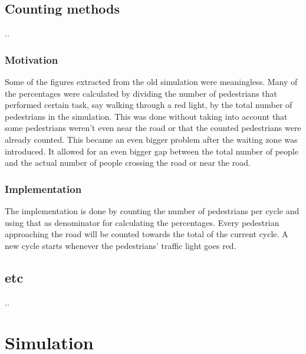 \documentclass[a4paper]{article}
\begin{document}
\subsection{Counting methods}
..

\subsubsection{Motivation}
Some of the figures extracted from the old simulation were meaningless. Many of the percentages were calculated by dividing the number of pedestrians that performed certain task, say walking through a red light, by the total number of pedestrians in the simulation. This was done without taking into account that some pedestrians weren't even near the road or that the counted pedestrians were already counted.
This became an even bigger problem after the waiting zone was introduced. It allowed for an even bigger gap between the total number of people and the actual number of people crossing the road or near the road.

\subsubsection{Implementation}
The implementation is done by counting the number of pedestrians per cycle and using that as denominator for calculating the percentages. Every pedestrian approaching the road will be counted towards the total of the current cycle. A new cycle starts whenever the pedestrians' traffic light goes red.

\subsection{etc}
..

\clearpage

\section{Simulation}
\end{document}
